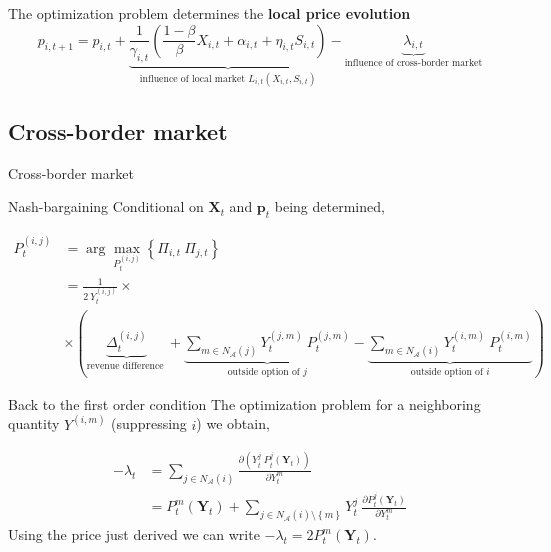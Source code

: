\documentclass{beamer}
\newcommand{\matr}[1]{\bm{#1}}
\newcommand{\set}[1]{\left\{#1\right\}}
\newcommand{\Y}{\matr{Y}}
\begin{document}
\begin{frame}

    The optimization problem determines the \textbf{local price evolution}
    \begin{equation*}
        p_{i, t+1} = p_{i, t} + \underbrace{\frac{1}{\gamma_{i, t}} \left( \frac{1-\beta}{\beta } X_{i, t} + \alpha_{i, t} + \eta_{i, t} S_{i, t} \right)}_{\text{influence of local market } L_{i, t}(X_{i, t}, S_{i, t})} - \underbrace{\lambda_{i, t}}_{\text{influence of cross-border market}}
    \end{equation*}

\end{frame}

\subsection{Cross-border market}

\begin{frame}{Cross-border market}
    \centering
    \resizebox{\textwidth}{!}{}
\end{frame}

\begin{frame}{Nash-bargaining}
    Conditional on $\matr{X}_t$ and $\matr{p}_t$ being determined,

    \begin{equation*}
        \begin{split}
            P_t^{(i, j)} &= \arg \max_{P_t^{(i, j)}} \left\{\Pi_{i, t} \  \Pi_{j, t} \right\} \\
            &= \frac{1}{2\  Y_t^{(i, j)}} \times \\
            &\times \left( \underbrace{\Delta^{(i, j)}_t}_{\text{revenue difference }}
            + \underbrace{\sum_{m\in N_{\mathcal{A}}(j)} Y_t^{(j, m)} \  P_t^{(j, m)}}_{\text{outside option of } j}
            - \underbrace{\sum_{m \in N_{\mathcal{A}}(i)} Y_t^{(i, m)} \  P_t^{(i, m)}}_{\text{outside option of } i} \right)
        \end{split}
    \end{equation*}
\end{frame}

\begin{frame}{Back to the first order condition}
    The optimization problem for a neighboring quantity $Y^{(i, m)}$ (suppressing $i$) we obtain,

    \begin{equation*}
        \begin{split}
            -\lambda_t &= \sum_{j \in N_{\mathcal{A}}(i)} \frac{\partial (Y_t^j \  P_t^j(\Y_t))}{\partial Y_t^m} \\
            &= P_t^m(\Y_t) + \sum_{j \in N_{\mathcal{A}}(i) \setminus \set{m}} Y_t^j \  \frac{\partial P_t^j(\Y_t)}{\partial Y_t^m}
        \end{split}
    \end{equation*}
    Using the price just derived we can write $-\lambda_t = 2 P_t^m(\Y_t) $.

\end{frame}
\end{document}
